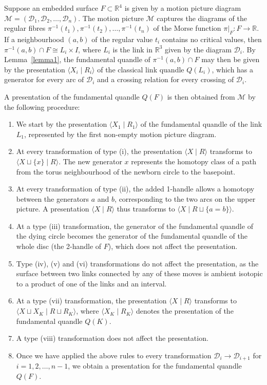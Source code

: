 \documentclass[a4paper,12pt]{amsart}
\numberwithin{equation}{section}
\theoremstyle{plain}
\theoremstyle{definition}
\newcommand{\RR}{\mathbb{R}}
\begin{document}
Suppose an embedded surface $F\subset \RR^{4}$ is given by a motion picture diagram $\mathcal{M}=(\mathcal{D}_{1},\mathcal{D}_{2},\ldots ,\mathcal{D}_{n})$. 
The motion picture $\mathcal{M}$ captures the diagrams of the regular fibres $\pi ^{-1}(t_{1}), \pi ^{-1}(t_2), \ldots ,\pi ^{-1}(t_{n})$ of the Morse function $\pi |_{F}\colon F\to \RR $. 
If a neighbourhood $(a,b)$ of the regular value $t_i$ contains no critical values, then $\pi ^{-1}(a,b)\cap F\cong L_{i}\times I$, where $L_i$ is the link in $\RR ^3$ given by the diagram $\mathcal{D}_i$. 
By Lemma~\ref{lemma1}, the fundamental quandle of $\pi ^{-1}(a,b)\cap F$ may then be given by the presentation $\langle X_{i}\mid R_{i}\rangle $ of the classical link quandle $Q(L_i)$, which has a generator for every arc of $\mathcal{D}_i$ and a crossing relation for every crossing of $\mathcal{D}_i$. 


A presentation of the fundamental quandle $Q(F)$ is then obtained from $\mathcal{M}$ by the following procedure: \label{procedure}
\begin{enumerate}
	\item We start by the presentation $\langle X_{1}\mid R_{1}\rangle $ of the fundamental quandle of the link $L_{1}$, represented by the first non-empty motion picture diagram. 
	\item At every transformation of type (i), the presentation $\langle X\mid R\rangle$ transforms to $\langle X\sqcup \{x\}\mid R\rangle $. The new generator $x$ represents the homotopy class of a path from the torus neighbourhood of the newborn circle to the basepoint. 
	\item At every transformation of type (ii), the added 1-handle allows a homotopy between the generators $a$ and $b$, corresponding to the two arcs on the upper picture. A presentation $\langle X\mid R\rangle$ thus transforms to $\langle X\mid R\sqcup \{a=b\}\rangle $.
	\item At a type (iii) transformation, the generator of the fundamental quandle of the dying circle becomes the generator of the fundamental quandle of the whole disc (the 2-handle of $F$), which does not affect the presentation. 
	\item Type (iv), (v) and (vi) transformations do not affect the presentation, as the surface between two links connected by any of these moves is ambient isotopic to a product of one of the links and an interval.
	\item At a type (vii) transformation, the presentation $\langle X\mid R\rangle $ transforms to $\langle X\sqcup X_{K}\mid R\sqcup R_{K}\rangle $, where $\langle X_K\mid R_K\rangle $ denotes the presentation of the fundamental quandle $Q(K)$.
	\item A type (viii) transformation does not affect the presentation.
	\item Once we have applied the above rules to every transformation $\mathcal{D}_{i}\to \mathcal{D}_{i+1}$ for $i=1,2,\ldots ,n-1$, we obtain a presentation for the fundamental quandle $Q(F)$. 
\end{enumerate}
\end{document}
